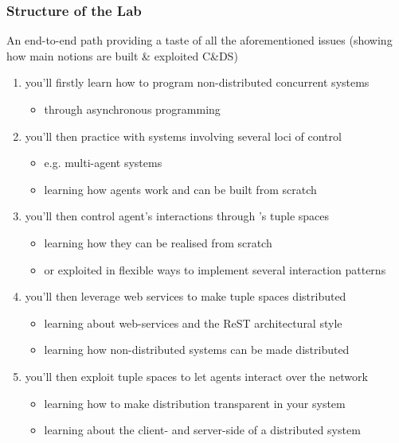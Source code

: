 \documentclass[presentation]{beamer}\mode<presentation>{\usetheme{AMSCesenaPurpleAndGold}}
\begin{document}
\begin{frame}[allowframebreaks]
	\frametitle{Structure of the Lab}

	An end-to-end path providing a taste of all the aforementioned issues (showing how main notions are built \& exploited C\&DS)
	\medskip
	\begin{enumerate}
		\item you'll firstly learn how to program non-distributed concurrent systems
		\begin{itemize}
			\item through \alert{asynchronous programming}
		\end{itemize}

		\medskip

		\item you'll then practice with systems involving several loci of control
		\begin{itemize}
			\item e.g. \alert{multi-agent systems}
			\item learning how \jade{} agents work and can be built from scratch
		\end{itemize}

		\medskip

		\item you'll then control agent's interactions through \alert{\linda{}'s tuple spaces}
		\begin{itemize}
			\item learning how they can be realised from scratch
			\item or exploited in flexible ways to implement several \alert{interaction patterns}
		\end{itemize}

		\framebreak

		\item you'll then leverage \alert{web services} to make tuple spaces distributed
		\begin{itemize}
			\item learning about web-services and the ReST architectural style
			\item learning how non-distributed systems can be made distributed
		\end{itemize}

		\medskip

		\item you'll then exploit tuple spaces to let agents interact \alert{over the network}
		\begin{itemize}
			\item learning how to make distribution transparent in your system
			\item learning about the client- and server-side of a distributed system
		\end{itemize}


\end{enumerate}
\end{frame}
\end{document}
